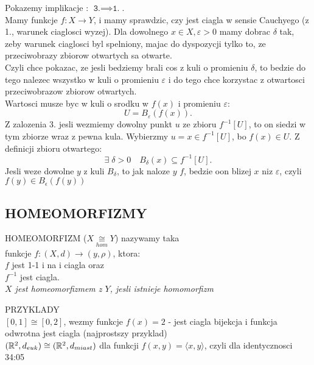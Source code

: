 \documentclass{article}
\begin{document}
    Pokazemy implikacje : $\texttt{3.}\implies\texttt{1.}$.\medskip\\
    Mamy funkcje $f:X\to Y$, i mamy sprawdzic, czy jest ciagla w sensie Cauchyego (z 1., warunek ciaglosci wyzej). Dla dowolnego $x\in X,\varepsilon>0$ mamy dobrac $\delta$ tak, zeby warunek ciaglosci byl spelniony, majac do dyspozycji tylko to, ze przeciwobrazy zbiorow otwartych sa otwarte.\smallskip\\
    Czyli chce pokazac, ze jesli bedziemy brali cos z kuli o promieniu $\delta$, to bedzie do tego nalezec wszystko w kuli o promieniu $\varepsilon$ i do tego chce korzystac z otwartosci przeciwobrazow zbiorow otwartych.\smallskip\\
    Wartosci musze byc w kuli o srodku w $f(x)$ i promieniu $\varepsilon$:
        $$U=B_\varepsilon(f(x)).$$
    Z zalozenia 3. jesli wezmiemy dowolny punkt $u$ ze zbioru $f^{-1}[U]$, to on siedzi w tym zbiorze wraz z pewna kula. Wybierzmy $u=x\in f^{-1}[U]$, bo $f(x)\in U$. Z definicji zbioru otwartego:
        $$\exists\;\delta>0\quad B_\delta{(x)}\subseteq f^{-1}[U].$$
    Jesli weze dowolne $y$ z kuli $B_\delta$, to jak naloze $y$ $f$, bedzie oon blizej $x$ niz $\varepsilon$, czyli $f(y)\in B_\epsilon(f(y))$
\subsection*{HOMEOMORFIZMY}
    \begin{center}\large
        \color{def}HOMEOMORFIZM \color{txt}($X\underset{hom}{\cong}Y$) nazywamy taka \\funkcje $f:(X,d)\to(y,\rho)$, ktora:\medskip\\
        $f$ jest 1-1 i na i ciagla oraz \smallskip\\
        $f^{-1}$ jest ciagla.\medskip\\
        \emph{$X$ jest homeomorfizmem z $Y$, jesli istnieje homomorfizm}
    \end{center}\bigskip
    \large \color{emp}PRZYKLADY\color{txt}\normalsize\bigskip\\
    $[0,1]\cong [0,2]$, wezmy funkcje $f(x)=2$ - jest ciagla bijekcja i funkcja odwrotna jest ciagla (najprostszy przyklad)\medskip\\
    $(\mathbb{R}^2, d_{euk})\cong(\mathbb{R}^2, d_{miast})$ dla funkcji $f(x,y)=\langle x,y\rangle$, czyli dla identycznosci 34:05
\end{document}
